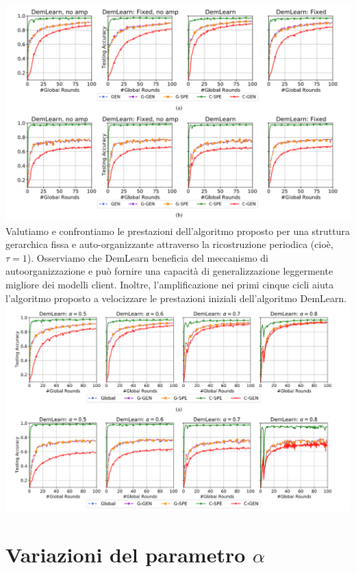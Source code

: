 \includegraphics[scale=0.5]{AlgoStructureComp}
 \vspace{0.5cm}
Valutiamo e confrontiamo le prestazioni dell'algoritmo proposto per una struttura gerarchica fissa e auto-organizzante attraverso la ricostruzione periodica (cioè, $\tau=1$). Osserviamo che DemLearn beneficia del meccanismo di autoorganizzazione e può fornire una capacità di generalizzazione leggermente migliore dei modelli client. Inoltre, l'amplificazione nei primi cinque cicli aiuta l'algoritmo proposto a velocizzare le prestazioni iniziali dell'algoritmo DemLearn.\\
\includegraphics[scale=0.4]{DemAlpha}
 \vspace{0.5cm}

\section{Variazioni del parametro $\alpha$}


